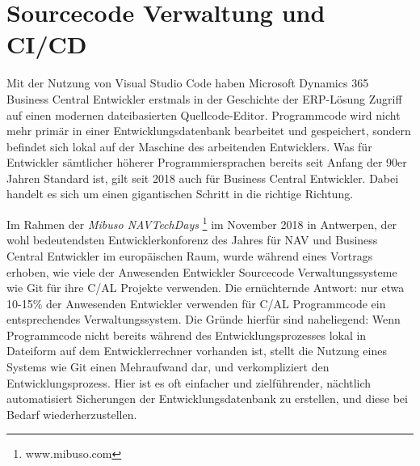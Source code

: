 \section{Sourcecode Verwaltung und CI/CD}
Mit der Nutzung von Visual Studio Code haben Microsoft Dynamics 365 Business Central Entwickler erstmals in der Geschichte der ERP-Lösung Zugriff auf einen modernen dateibasierten Quellcode-Editor. Programmcode wird nicht mehr primär in einer Entwicklungsdatenbank bearbeitet und gespeichert, sondern befindet sich lokal auf der Maschine des arbeitenden Entwicklers. Was für Entwickler sämtlicher höherer Programmiersprachen bereits seit Anfang der 90er Jahren Standard ist, gilt seit 2018 auch für Business Central Entwickler. Dabei handelt es sich um einen gigantischen Schritt in die richtige Richtung. 

Im Rahmen der \textit{Mibuso NAVTechDays} \footnote{www.mibuso.com} im November 2018 in Antwerpen, der wohl bedeutendsten Entwicklerkonforenz des Jahres für NAV und Business Central Entwickler im europäischen Raum, wurde während eines Vortrags erhoben, wie viele der Anwesenden Entwickler Sourcecode Verwaltungssysteme wie Git für ihre C/AL Projekte verwenden. Die ernüchternde Antwort: nur etwa 10-15\% der Anwesenden Entwickler verwenden für C/AL Programmcode ein entsprechendes Verwaltungssystem. Die Gründe hierfür sind naheliegend: Wenn Programmcode nicht bereits während des Entwicklungsprozesses lokal in Dateiform auf dem Entwicklerrechner vorhanden ist, stellt die Nutzung eines Systems wie Git einen Mehraufwand dar, und verkompliziert den Entwicklungsprozess. Hier ist es oft einfacher und zielführender, nächtlich automatisiert Sicherungen der Entwicklungsdatenbank zu erstellen, und diese bei Bedarf wiederherzustellen.






